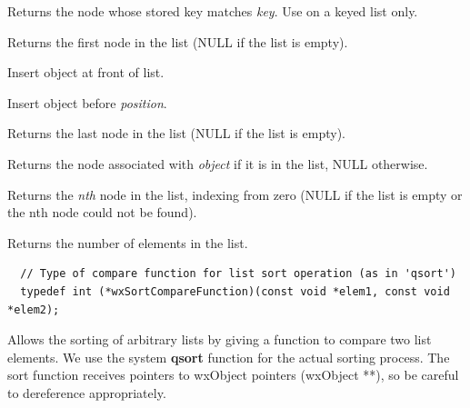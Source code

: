 


Returns the node whose stored key matches {\it key}. Use on a keyed list only.



Returns the first node in the list (NULL if the list is empty).



Insert object at front of list.


Insert object before {\it position}.




Returns the last node in the list (NULL if the list is empty).



Returns the node associated with {\it object} if it is in the list, NULL otherwise.



Returns the {\it nth} node in the list, indexing from zero (NULL if the list is empty
or the nth node could not be found).



Returns the number of elements in the list.



\begin{verbatim}
  // Type of compare function for list sort operation (as in 'qsort')
  typedef int (*wxSortCompareFunction)(const void *elem1, const void *elem2);
\end{verbatim}

Allows the sorting of arbitrary lists by giving
a function to compare two list elements. We use the system {\bf qsort} function
for the actual sorting process. The sort function receives pointers to wxObject pointers (wxObject **),
so be careful to dereference appropriately.

